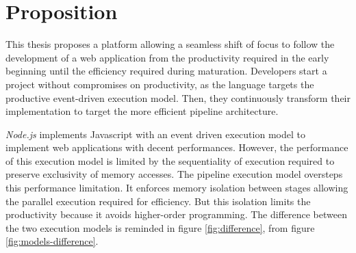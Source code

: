 \section{Proposition} \label{chapter4:proposition}

This thesis proposes a platform allowing a seamless shift of focus to follow the development of a web application from the productivity required in the early beginning until the efficiency required during maturation.
Developers start a project without compromises on productivity, as the language targets the productive event-driven execution model.
Then, they continuously transform their implementation to target the more efficient pipeline architecture.



\textit{Node.js} implements Javascript with an event driven execution model to implement web applications with decent performances.
However, the performance of this execution model is limited by the sequentiality of execution required to preserve exclusivity of memory accesses.
The pipeline execution model oversteps this performance limitation.
It enforces memory isolation between stages allowing the parallel execution required for efficiency.
But this isolation limits the productivity because it avoids higher-order programming.
The difference between the two execution models is reminded in figure \ref{fig:difference}, from figure \ref{fig:models-difference}.

